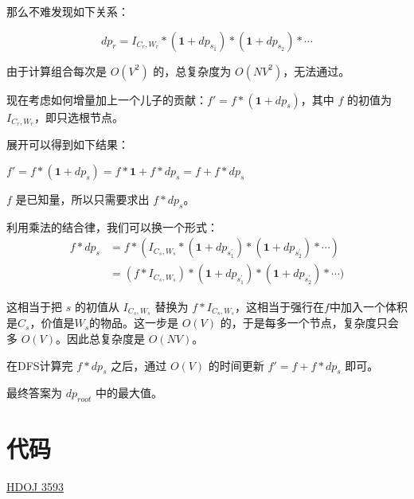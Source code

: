 \documentclass{article}
\begin{document}
那么不难发现如下关系：

$$
dp_r = I_{C_r,W_r} * (\textbf{1}+dp_{s_1})* (\textbf{1}+dp_{s_2}) * \cdots
$$

由于计算组合每次是 $O(V^2)$ 的，总复杂度为 $O(NV^2)$，无法通过。

现在考虑如何增量加上一个儿子的贡献：$f' = f * (\textbf{1}+dp_s)$，其中 $f$ 的初值为 $I_{C_r,W_r}$，即只选根节点。

展开可以得到如下结果：
\begin{center}
    $f' = f * (\textbf{1}+dp_s) = f*\textbf{1} + f*dp_s = f + f*dp_s$
\end{center}

$f$ 是已知量，所以只需要求出 $f*dp_s$。

利用乘法的结合律，我们可以换一个形式：
\begin{align*}
    f*dp_s
    &= f * (I_{C_s,W_s} * (\textbf{1}+dp_{s_{1}^{\prime}})* (\textbf{1}+dp_{s_2^{\prime}}) * \cdots)\\
    &= (f * I_{C_s,W_s}) * (\textbf{1}+dp_{s_{1}^{\prime}})* (\textbf{1}+dp_{s_2^{\prime}}) * \cdots)
\end{align*}

这相当于把 $s$ 的初值从 $I_{C_s,W_s}$ 替换为 $f * I_{C_s,W_s}$，这相当于强行在$f$中加入一个体积是$C_s$，价值是$W_s$的物品。这一步是 $O(V)$ 的，于是每多一个节点，复杂度只会多 $O(V)$。因此总复杂度是 $O(NV)$。

在DFS计算完 $f*dp_s$ 之后，通过 $O(V)$ 的时间更新 $f' = f+f*dp_s$ 即可。

最终答案为 $dp_{root}$ 中的最大值。

\section{代码}
\href{https://gist.github.com/SamZhangQingChuan/7c15974f308a45d6fcb114d029b4eda8}{HDOJ 3593}
\end{document}
